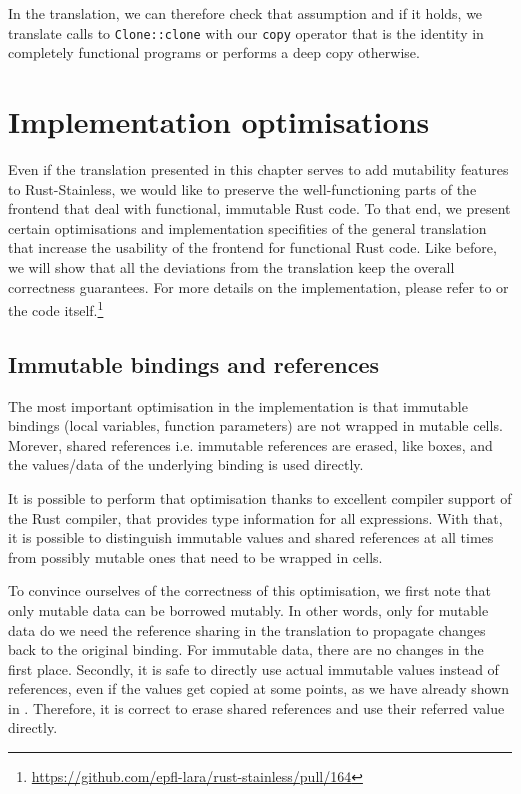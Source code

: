 In the translation, we can therefore check that assumption and if it
holds, we translate calls to \passthrough{\lstinline!Clone::clone!} with
our \passthrough{\lstinline!copy!} operator that is the identity in
completely functional programs or performs a deep copy otherwise.







\section{Implementation optimisations}

Even if the translation presented in this chapter serves to add mutability
features to Rust-Stainless, we would like to preserve the well-functioning parts
of the frontend that deal with functional, immutable Rust code. To that end, we
present certain optimisations and implementation specifities of the general
translation  that increase the usability of the frontend for functional Rust
code. Like before, we will show that all the deviations from the translation
keep the overall correctness guarantees. For more details on the implementation,
please refer to  or the code
itself.\footnote{\url{https://github.com/epfl-lara/rust-stainless/pull/164}}

\subsection{Immutable bindings and references}

The most important optimisation in the implementation is that immutable bindings
(local variables, function parameters) are not wrapped in mutable cells.
Morever, shared references i.e. immutable references are erased, like boxes, and
the values/data of the underlying binding is used directly.

It is possible to perform that optimisation thanks to excellent compiler support
of the Rust compiler, that provides type information for all expressions. With
that, it is  possible to distinguish immutable values and shared references at
all times from  possibly mutable ones that need to be wrapped in cells.

To convince ourselves of the correctness of this optimisation, we first note
that only mutable data can be borrowed mutably. In other words, only for mutable
data do we need the reference sharing in the translation to propagate changes
back to the original binding. For immutable data, there are no changes in the
first place. Secondly, it is safe to directly use actual immutable values
instead of references, even if the values get copied at some points, as we have
already shown in . Therefore, it is correct to
erase shared references and use their referred value directly.

